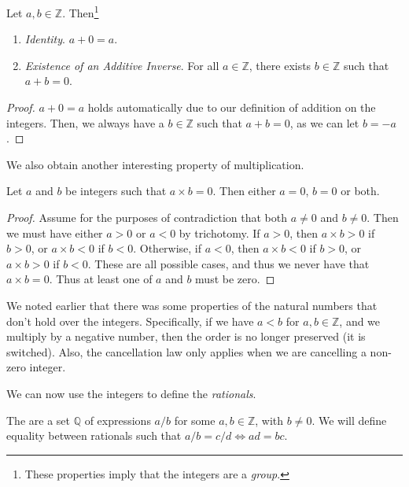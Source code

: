 \documentclass[a4paper]{scrartcl}
\begin{document}
\begin{proposition}
	Let $a, b \in \mathbb{Z}$. Then\footnote{These properties imply that the integers are a \emph{group}.}
	\begin{enumerate}[label=(\roman*)]
		\item \emph{Identity}. $a + 0 = a$.
		\item \emph{Existence of an Additive Inverse}. For all $a \in \mathbb{Z}$, there exists $b \in \mathbb{Z}$ such that $a + b = 0$.
	\end{enumerate}
\end{proposition}
\begin{proof}
	$a + 0 = a$ holds automatically due to our definition of addition on the integers. Then, we always have a $b \in \mathbb{Z}$ such that $a + b = 0$, as we can let $b = -a$.
\end{proof}

We also obtain another interesting property of multiplication.

\begin{proposition}
	Let $a$ and $b$ be integers such that $a \times b = 0$. Then either $a = 0$, $b = 0$ or both.
\end{proposition}
\begin{proof}
	Assume for the purposes of contradiction that both $a \neq 0$ and $b \neq 0$. Then we must have either $a > 0$ or $a < 0$ by trichotomy. If $a > 0$, then $a \times b > 0$ if $b > 0$, or $a \times b < 0$ if $b < 0$. Otherwise, if $a < 0$, then $a \times b < 0$ if $b > 0$, or $a \times b > 0$ if $b < 0$. These are all possible cases, and thus we never have that $a \times b = 0$. Thus at least one of $a$ and $b$ must be zero. 
\end{proof}

\begin{remark}[Caveats]
	We noted earlier that there was some properties of the natural numbers that don't hold over the integers. Specifically, if we have $a < b$ for $a, b \in \mathbb{Z}$, and we multiply by a negative number, then the order is no longer preserved (it is switched). Also, the cancellation law only applies when we are cancelling a non-zero integer.
\end{remark}

We can now use the integers to define the \emph{rationals}.

\begin{definition}[Rationals]
	The  are a set $\mathbb{Q}$ of expressions $a/b$ for some $a, b \in \mathbb{Z}$, with $b \neq 0$. We will define equality between rationals such that $a/b = c/d \iff ad = bc$. 
\end{definition}
\end{document}
